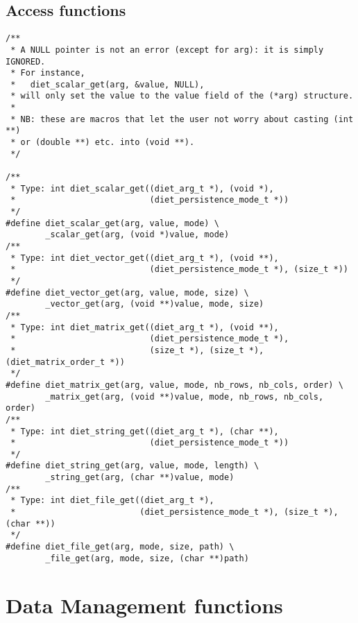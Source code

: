 \subsection{Access functions}
\label{sec:accessfun}
{\footnotesize
\begin{verbatim}
/**
 * A NULL pointer is not an error (except for arg): it is simply IGNORED.
 * For instance,
 *   diet_scalar_get(arg, &value, NULL),
 * will only set the value to the value field of the (*arg) structure.
 * 
 * NB: these are macros that let the user not worry about casting (int **)
 * or (double **) etc. into (void **).
 */

/**
 * Type: int diet_scalar_get((diet_arg_t *), (void *),
 *                           (diet_persistence_mode_t *))
 */
#define diet_scalar_get(arg, value, mode) \
        _scalar_get(arg, (void *)value, mode)
/**
 * Type: int diet_vector_get((diet_arg_t *), (void **),
 *                           (diet_persistence_mode_t *), (size_t *))
 */
#define diet_vector_get(arg, value, mode, size) \
        _vector_get(arg, (void **)value, mode, size)
/**
 * Type: int diet_matrix_get((diet_arg_t *), (void **),
 *                           (diet_persistence_mode_t *),
 *                           (size_t *), (size_t *), (diet_matrix_order_t *))
 */
#define diet_matrix_get(arg, value, mode, nb_rows, nb_cols, order) \
        _matrix_get(arg, (void **)value, mode, nb_rows, nb_cols, order)
/**
 * Type: int diet_string_get((diet_arg_t *), (char **),
 *                           (diet_persistence_mode_t *))
 */
#define diet_string_get(arg, value, mode, length) \
        _string_get(arg, (char **)value, mode)
/**
 * Type: int diet_file_get((diet_arg_t *),
 *                         (diet_persistence_mode_t *), (size_t *), (char **))
 */
#define diet_file_get(arg, mode, size, path) \
        _file_get(arg, mode, size, (char **)path)
\end{verbatim}
}


\section{Data Management functions}

